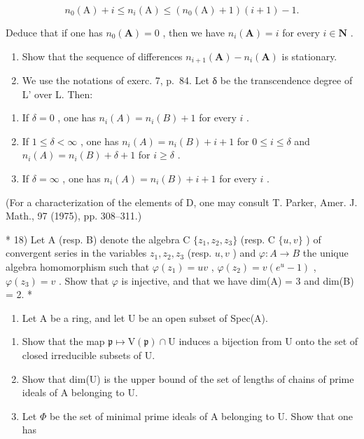 \[
n _ {0} (\mathrm{A}) + i \leqslant n _ {i} (\mathrm{A}) \leqslant (n _ {0} (\mathrm{A}) + 1) (i + 1) - 1.
\]

Deduce that if one has \(n_0(\mathbf{A}) = 0\) , then we have \(n_i(\mathbf{A}) = i\) for every \(i \in \mathbf{N}\) .

\begin{enumerate}
\def\labelenumi{\alph{enumi})}
\setcounter{enumi}{3}
\item
  Show that the sequence of differences \(n_{i+1}(\mathbf{A}) - n_i(\mathbf{A})\) is stationary.
\item
  We use the notations of exerc. 7, p.~84. Let δ be the transcendence degree of L' over L. Then:
\end{enumerate}

\begin{enumerate}
\def\labelenumi{(\roman{enumi})}
\item
  If \(\delta = 0\) , one has \(n_i(A) = n_i(B) + 1\) for every \(i\) .
\item
  If \(1 \leqslant \delta < \infty\) , one has \(n_i(A) = n_i(B) + i + 1\) for \(0 \leqslant i \leqslant \delta\) and \(n_i(A) = n_i(B) + \delta + 1\) for \(i \geqslant \delta\) .
\item
  If \(\delta = \infty\) , one has \(n_i(A) = n_i(B) + i + 1\) for every \(i\) .
\end{enumerate}

(For a characterization of the elements of D, one may consult T. Parker, Amer. J. Math., 97 (1975), pp. 308–311.)

* 18) Let A (resp. B) denote the algebra C \(\{z_{1}, z_{2}, z_{3}\}\) (resp. C \(\{u, v\}\) ) of convergent series in the variables \(z_{1}, z_{2}, z_{3}\) (resp. \(u, v\) ) and \(\varphi: A \to B\) the unique algebra homomorphism such that \(\varphi(z_{1}) = uv\) , \(\varphi(z_{2}) = v(e^{u} - 1)\) , \(\varphi(z_{3}) = v\) . Show that \(\varphi\) is injective, and that we have dim(A) = 3 and dim(B) = 2. *


\begin{enumerate}
\def\labelenumi{\arabic{enumi})}
\tightlist
\item
  Let A be a ring, and let U be an open subset of Spec(A).
\end{enumerate}

\begin{enumerate}
\def\labelenumi{\alph{enumi})}
\item
  Show that the map \(\mathfrak{p} \mapsto \mathrm{V}(\mathfrak{p}) \cap \mathrm{U}\) induces a bijection from U onto the set of closed irreducible subsets of U.
\item
  Show that dim(U) is the upper bound of the set of lengths of chains of prime ideals of A belonging to U.
\item
  Let \(\Phi\) be the set of minimal prime ideals of A belonging to U. Show that one has
\end{enumerate}

